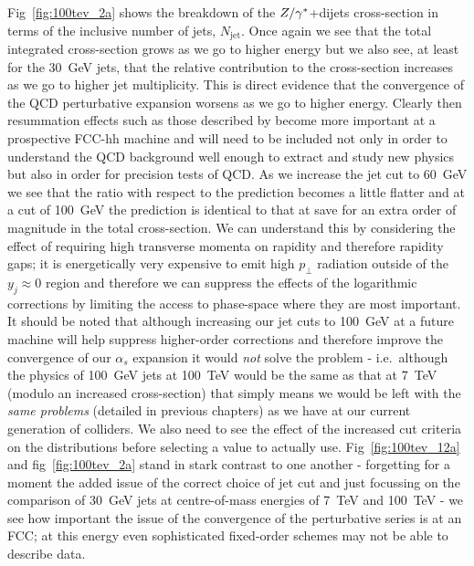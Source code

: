 	Fig~\eqref{fig:100tev_2a} shows the breakdown of the $Z/\gamma^*$+dijets cross-section in terms of the inclusive number
	of jets, $N_{\text{jet}}$.  Once again we see that the total integrated cross-section grows as we
	go to higher energy but we also see, at least for the 30~GeV jets, that the relative contribution to the cross-section
	increases as we go to higher jet multiplicity.  This is direct evidence that the convergence of the
	QCD perturbative expansion worsens as we go to higher energy.  Clearly then resummation effects
	such as those described by \hej become more important at a prospective FCC-hh machine and will need
	to be included not only in order to understand the QCD background well enough to extract and
	study new physics but also in order for precision tests of QCD.  As we increase the jet cut to 60~GeV
	we see that the ratio with respect to the \stev prediction becomes a little flatter and at a cut of 100~GeV
	the prediction is identical to that at \stev save for an extra order of magnitude in the total cross-section.
	We can understand this by considering the effect of requiring high transverse momenta on rapidity and therefore
	rapidity gaps; it is energetically very expensive to emit high $p_\perp$ radiation outside of the $y_j\approx0$ region
	and therefore we can suppress the effects of the logarithmic corrections by limiting the access to phase-space
	where they are most important.  It should be noted that although increasing our jet cuts to 100~GeV at a future
	machine will help suppress higher-order corrections and therefore improve the convergence of our $\alpha_s$ expansion
	it would \emph{not} solve the problem - i.e.~although the physics of 100~GeV jets at 100~TeV would be the same as that at 7~TeV
	(modulo an increased cross-section) that simply means we would be left with the \emph{same problems} (detailed in previous
	chapters) as we have at our current generation of colliders.  We also need to see the effect of the increased cut criteria
	on the distributions before selecting a value to actually use.  Fig~\eqref{fig:100tev_12a} and fig~\eqref{fig:100tev_2a} stand
	in stark contrast to one another - forgetting for a moment the added issue of the correct choice of jet cut and just focussing
	on the comparison of 30~GeV jets at centre-of-mass energies of 7~TeV and 100~TeV - we see how important the
	issue of the convergence of the perturbative series is at an FCC; at this energy even sophisticated fixed-order
	schemes may not be able to describe data.

